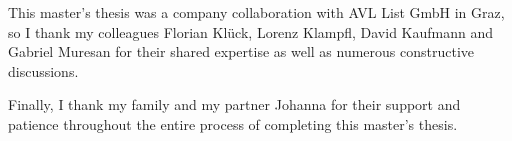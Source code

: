 This master's thesis was a company collaboration with AVL List GmbH in Graz, so I thank my colleagues Florian Klück, Lorenz Klampfl, David Kaufmann and Gabriel Muresan for their shared expertise as well as numerous constructive discussions.

Finally, I thank my family and my partner Johanna for their support and patience throughout the entire process of completing this master's thesis.



